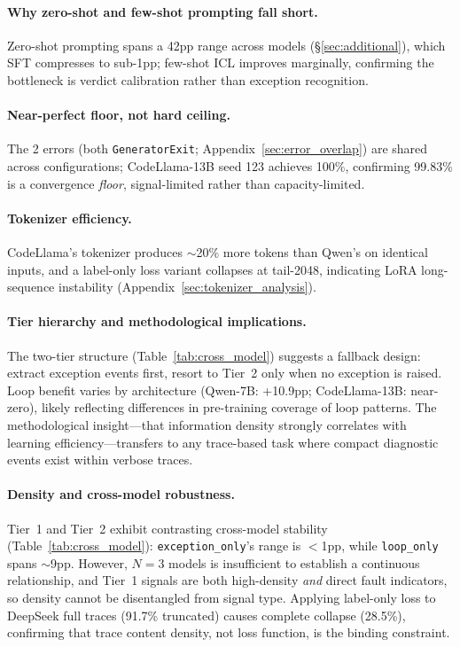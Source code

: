 \paragraph{Why zero-shot and few-shot prompting fall short.}
Zero-shot prompting spans a 42pp range across models (\S\ref{sec:additional}), which SFT compresses to sub-1pp; few-shot ICL improves marginally, confirming the bottleneck is verdict calibration rather than exception recognition.


\paragraph{Near-perfect floor, not hard ceiling.}
The 2 errors (both \texttt{GeneratorExit}; Appendix~\ref{sec:error_overlap}) are shared across configurations; CodeLlama-13B seed 123 achieves 100\%, confirming 99.83\% is a convergence \emph{floor}, signal-limited rather than capacity-limited.

\paragraph{Tokenizer efficiency.}
CodeLlama's tokenizer produces ${\sim}$20\% more tokens than Qwen's on identical inputs, and a label-only loss variant collapses at tail-2048, indicating LoRA long-sequence instability (Appendix~\ref{sec:tokenizer_analysis}).

\paragraph{Tier hierarchy and methodological implications.}
The two-tier structure (Table~\ref{tab:cross_model}) suggests a fallback design: extract exception events first, resort to Tier~2 only when no exception is raised.
Loop benefit varies by architecture (Qwen-7B: +10.9pp; CodeLlama-13B: near-zero), likely reflecting differences in pre-training coverage of loop patterns.
The methodological insight---that information density strongly correlates with learning efficiency---transfers to any trace-based task where compact diagnostic events exist within verbose traces.

\paragraph{Density and cross-model robustness.}
Tier~1 and Tier~2 exhibit contrasting cross-model stability (Table~\ref{tab:cross_model}): \texttt{exception\_only}'s range is ${<}$1pp, while \texttt{loop\_only} spans ${\sim}$9pp.
However, $N{=}3$ models is insufficient to establish a continuous relationship, and Tier~1 signals are both high-density \emph{and} direct fault indicators, so density cannot be disentangled from signal type.
Applying label-only loss to DeepSeek full traces (91.7\% truncated) causes complete collapse (28.5\%), confirming that trace content density, not loss function, is the binding constraint.



